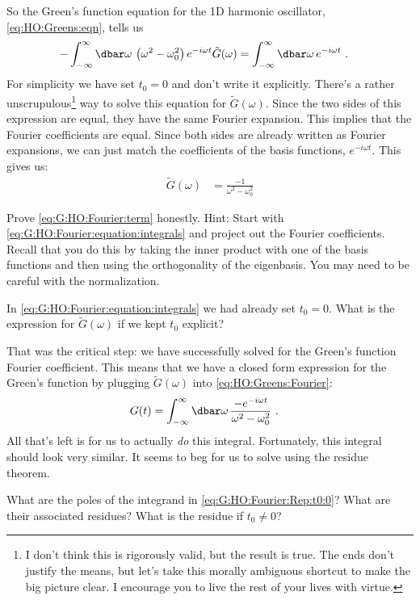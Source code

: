 So the Green's function equation for the 1D harmonic oscillator, \eqref{eq:HO:Greens:eqn}, tells us
\begin{align}
  -
  \int_{-\infty}^\infty \dbar \omega \, 
  \left(\omega^2-\omega_0^2\right) e^{-i\omega t} \tilde G(\omega)
  &=
  \int_{-\infty}^\infty \dbar \omega \, e^{-i\omega t}
  \ .
  \label{eq:G:HO:Fourier:equation:integrals}
\end{align}
For simplicity we have set $t_0=0$ and don't write it explicitly. There's a rather unscrupulous\footnote{I don't think this is rigorously valid, but the result is true. The ends don't justify the means, but let's take this morally ambiguous shortcut to make the big picture clear. I encourage you to live the rest of your lives with virtue.} way to solve this equation for $\tilde G(\omega)$. Since the two sides of this expression are equal, they have the same Fourier expansion. This implies that the Fourier coefficients are equal. Since both sides are already written as Fourier expansions, we can just match the coefficients of the basis functions, $e^{-i\omega t}$. This gives us:
\begin{align}
  \tilde G(\omega) &= \frac{-1}{\omega^2-\omega_0^2}
  \label{eq:G:HO:Fourier:term}
\end{align}
\begin{exercise}
Prove \eqref{eq:G:HO:Fourier:term} honestly. {Hint}: Start with \eqref{eq:G:HO:Fourier:equation:integrals} and project out the Fourier coefficients. Recall that you do this by taking the inner product with one of the basis functions and then using the orthogonality of the eigenbasis. You may need to be careful with the normalization.
\end{exercise}
\begin{exercise}
In \eqref{eq:G:HO:Fourier:equation:integrals} we had already set $t_0 = 0$. What is the expression for $\tilde G(\omega)$ if we kept $t_0$ explicit?
\label{eq:ex:Gtilde:with:t0:explicit}
\end{exercise}
That was the critical step: we have successfully solved for the Green's function Fourier coefficient. This means that we have a closed form expression for the Green's function by plugging $\tilde G(\omega)$ into \eqref{eq:HO:Greens:Fourier}:
\begin{align}
  G(t) &=  \int_{-\infty}^\infty \dbar \omega
  \, 
  \frac{-e^{-i\omega t}}{\omega^2-\omega_0^2} \ .
  \label{eq:G:HO:Fourier:Rep:t0:0}
\end{align}
All that's left is for us to actually \emph{do} this integral. Fortunately, this integral should look very similar. It seems to beg for us to solve using the residue theorem. 
\begin{exercise}
What are the poles of the integrand in \eqref{eq:G:HO:Fourier:Rep:t0:0}? What are their associated residues? What is the residue if $t_0\neq 0$?
\end{exercise}

